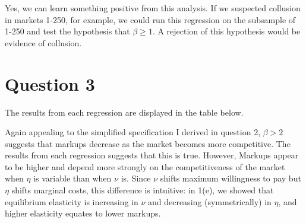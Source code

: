 \documentclass{article}
\begin{document}
Yes, we can learn something positive from this analysis. If we suspected collusion in markets 1-250, for example, we could run this regression on the subsample of 1-250 and test the hypothesis that ${\beta\geq1}$. A rejection of this hypothesis would be evidence of collusion.


\section*{Question 3}
The results from each regression are displayed in the table below.
\begin{center}
  
\end{center}
Again appealing to the simplified specification I derived in question 2, ${\beta>2}$ suggests that markups decrease as the market becomes more competitive. The results from each regression suggests that this is true. However, Markups appear to be higher and depend more strongly on the competitiveness of the market when $\eta$ is variable than when $\nu$ is. Since $\nu$ shifts maximum willingness to pay but $\eta$ shifts marginal costs, this difference is intuitive: in 1(e), we showed that equilibrium elasticity is increasing in $\nu$ and decreasing (symmetrically) in $\eta$, and higher elasticity equates to lower markups.

\end{document}

